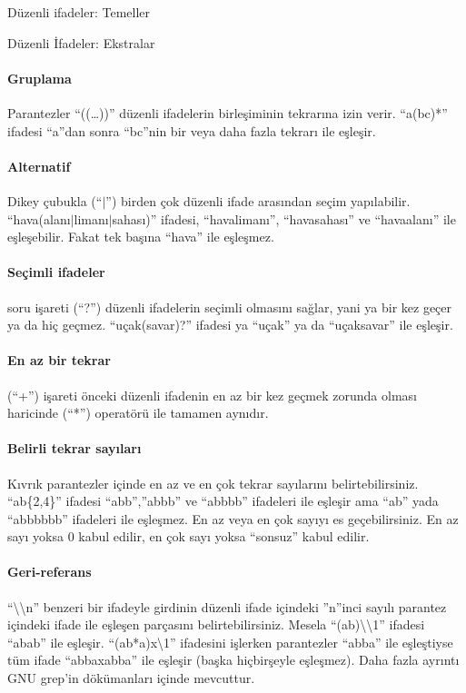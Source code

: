 \begin{section}{Düzenli ifadeler: Temeller}
\begin{subsection}{Düzenli İfadeler: Ekstralar}
\paragraph{Gruplama}{Parantezler “((\ldots))” düzenli ifadelerin birleşiminin tekrarına izin verir. “a(bc)*” ifadesi “a”dan sonra “bc”nin bir veya daha fazla tekrarı ile eşleşir.}
\paragraph{Alternatif}{Dikey çubukla (“$\vert$”) birden çok düzenli ifade arasından seçim yapılabilir. “hava(alanı$\vert$limanı$\vert$sahası)” ifadesi, “havalimanı”, “havasahası” ve “havaalanı” ile eşleşebilir. Fakat tek başına “hava” ile eşleşmez.}
\paragraph{Seçimli ifadeler}{soru işareti (“?”) düzenli ifadelerin seçimli olmasını sağlar, yani ya bir kez geçer ya da hiç geçmez. “uçak(savar)?” ifadesi ya “uçak” ya da “uçaksavar” ile eşleşir.}
\paragraph{En az bir tekrar}{(“+”) işareti önceki düzenli ifadenin en az bir kez geçmek zorunda olması haricinde (“*”) operatörü ile tamamen aynıdır.}
\paragraph{Belirli tekrar sayıları}{Kıvrık parantezler içinde en az ve en çok tekrar sayılarını belirtebilirsiniz. “ab\{2,4\}” ifadesi “abb”,”abbb” ve “abbbb” ifadeleri ile eşleşir ama “ab” yada “abbbbbb” ifadeleri ile eşleşmez. En az veya en çok sayıyı es geçebilirsiniz. En az sayı yoksa 0 kabul edilir, en çok sayı yoksa “sonsuz” kabul edilir.}
\paragraph{Geri-referans}{“\textbackslash \textbackslash n” benzeri bir ifadeyle girdinin düzenli ifade içindeki ”n”inci sayılı parantez içindeki ifade ile eşleşen parçasını belirtebilirsiniz. Mesela “(ab)\textbackslash \textbackslash 1” ifadesi “abab” ile eşleşir. “(ab*a)x\textbackslash 1” ifadesini işlerken parantezler “abba” ile eşleştiyse tüm ifade “abbaxabba” ile eşleşir (başka hiçbirşeyle eşleşmez). Daha fazla ayrıntı GNU grep’in dökümanları içinde mevcuttur.}

\end{subsection}
\end{section}
